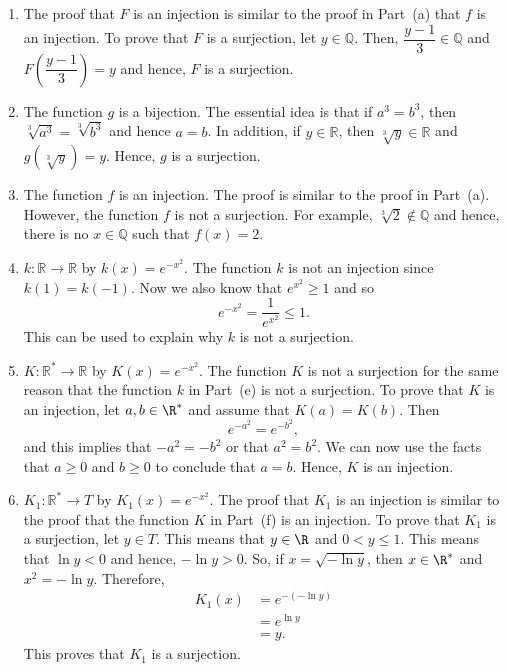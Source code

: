 \begin{enumerate}
\begin{enumerate}
\item The proof that $F$ is an injection is similar to the proof in Part~(a) that $f$ is an injection.  To prove that $F$ is a surjection, let $y \in \mathbb{Q}$.  Then, 
$\dfrac{y-1}{3} \in \mathbb{Q}$ and $F \left( \dfrac{y-1}{3} \right) = y$ and hence, $F$ is a surjection.


\item The function $g$ is a bijection.  The essential idea is that if $a^3 = b^3$, then 
$\sqrt[3]{a^3} = \sqrt[3]{b^3}$ and hence $a = b$.  In addition, if $y \in \mathbb{R}$, then 
$\sqrt[3]{y} \in \mathbb{R}$ and $g ( \sqrt[3]{y} ) = y$.  Hence, $g$ is a surjection.

\item The function $f$ is an injection.  The proof is similar to the proof in Part~(a).  However, the function $f$ is not a surjection.  For example, $\sqrt[3]{2} \notin \mathbb{Q}$ and hence, there is no $x \in \mathbb{Q}$ such that $f ( x ) = 2$.

\item $k: \mathbb{R} \to \mathbb{R}$  by  $k( x ) = e^{ - x^2 }$.  
The function $k$ is not an injection since $k(1) = k(-1)$.  Now we also know that 
$e^{x^2} \geq 1$ and so
\[
e^{-x^2} = \frac{1}{e^{x^2}} \leq 1.
\]
This can be used to explain why $k$ is not a surjection.

\item $K: \mathbb{R^*} \to \mathbb{R}$  by  $K( x ) = e^{ - x^2 }$.  
The function $K$ is not a surjection for the same reason that the function $k$ in Part~(e) is not a surjection.  To prove that $K$ is an injection, let $a, b \in \R^*$ and assume that 
$K(a) = K(b)$.  Then
\[
e^{-a^2} = e^{-b^2},
\]
and this implies that $-a^2 = -b^2$ or that $a^2 = b^2$.  We can now use the facts that 
$a \geq 0$ and $b \geq 0$ to conclude that $a = b$.  Hence, $K$ is an injection.


\item $K_1: \mathbb{R^*} \to T$  by  $K_1( x ) = e^{ - x^2 }$.  
The proof that $K_1$ is an injection is similar to the proof that the function $K$ in 
Part~(f) is an injection.  To prove that $K_1$ is a surjection, let $y \in T$.  This means that 
$y \in \R$ and $0 < y \leq 1$.  This means that $\ln y < 0$ and hence, $-\ln y > 0$.  So, if 
$x = \sqrt{-\ln y}$, then $x \in \R^*$ and $x^2 = -\ln y$.  Therefore,
\begin{align*}
K_1(x) &=  e^{-(-\ln y)} \\
     &= e^{\ln y} \\
     &= y.
\end{align*}
This proves that $K_1$ is a surjection.


\end{enumerate}
\end{enumerate}
